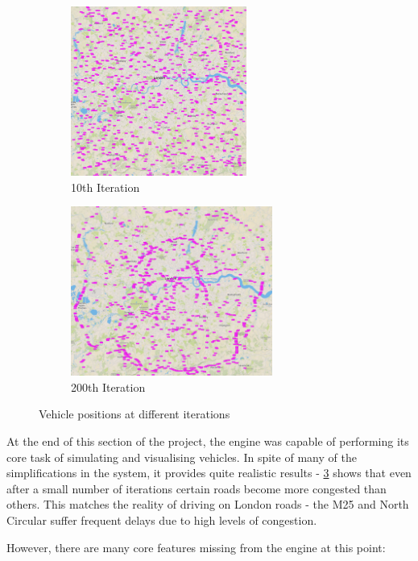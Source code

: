 \documentclass[ %
                    author={Alexander Hill},
                supervisor={Dr. Benjamin Sach},
                    degree={MEng},
                     title={MARMOSET},
                  subtitle={Multi-Agent Route Management using Online Simulation for Efficient Transportation},
                      type={research},
                      year={2016} ]{dissertation}
\begin{document}
\begin{figure}[h]
\centering
\begin{subfigure}[b]{0.4\textwidth}
    \centering
    \includegraphics[height=15em]{init-start}
    \caption{10th Iteration}\label{fig:init-start}
\end{subfigure}
\hspace{2em}
\begin{subfigure}[b]{0.4\textwidth}
    \centering
    \includegraphics[height=15em]{init-200}
    \caption{200th Iteration}\label{fig:init-200}
\end{subfigure}
\caption{Vehicle positions at different iterations}
\end{figure}

At the end of this section of the project, the engine was capable of performing
its core task of simulating and visualising vehicles. In spite of many of the
simplifications in the system, it provides quite realistic results -
\ref{fig:init-200} shows that even after a small number of iterations certain
roads become more congested than others. This matches the reality of driving on
London roads - the M25 and North Circular suffer frequent delays due to high
levels of congestion.

However, there are many core features missing from the engine at this point:
\end{document}
